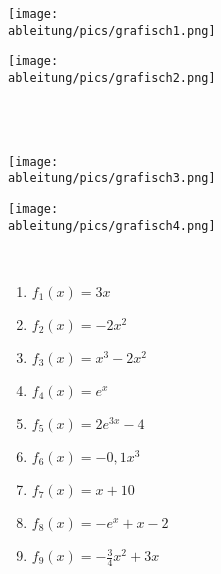 \documentclass[a4paper,12pt, headsepline, ngerman]{scrartcl}
\theoremstyle{definition}
\begin{document}
\newpage
\begin{minipage}{\textwidth}
	\begin{Exercise}[title={Schätze jeweils die Ableitung an den Stellen -2, 0, 1 und 3 ab.}, label=grafischABlA1]
\begin{minipage}{\textwidth}
	\begin{minipage}{0.49\textwidth}
		\centering\texttt{[image: \\ableitung/pics/grafisch1.png]}
	\end{minipage}
	\begin{minipage}{0.49\textwidth}
		\centering\texttt{[image: \\ableitung/pics/grafisch2.png]}
	\end{minipage}
\end{minipage}\\\phantom{x}\\
\begin{minipage}{\textwidth}
	\begin{minipage}{0.49\textwidth}
		\centering\texttt{[image: \\ableitung/pics/grafisch3.png]}
	\end{minipage}
	\begin{minipage}{0.49\textwidth}
		\centering\texttt{[image: \\ableitung/pics/grafisch4.png]}
	\end{minipage}\\
\end{minipage}
	\end{Exercise}
\end{minipage}
\begin{minipage}{\textwidth}
	\begin{Exercise}[title={Bestimme jeweils die durchschnittliche Änderungsrate auf den Intervallen \(I_1=[0,\ 2]\) sowie \(I_2=[-2,\ 2]\) und \(I_3=[-1,\ 4]\). Du kannst auf 2 Nachkommastellen runden, falls notwendig.}, label=grafischABlA2]
		\begin{enumerate}[label=\alph*)]
			\item \(f_1(x)=3x\)
			\item \(f_2(x)=-2x^2\)
			\item \(f_3(x)=x^3-2x^2\)
			\item \(f_4(x)=e^x\)
			\item \(f_5(x)=2e^{3x}-4\)
			\item \(f_6(x)=-0,1x^3\)
			\item \(f_7(x)=x+10\)
			\item \(f_8(x)=-e^x+x-2\)
			\item \(f_9(x)=-\frac{3}{4}x^2+3x\)
		\end{enumerate}
	\end{Exercise}
\end{minipage}
\end{document}
